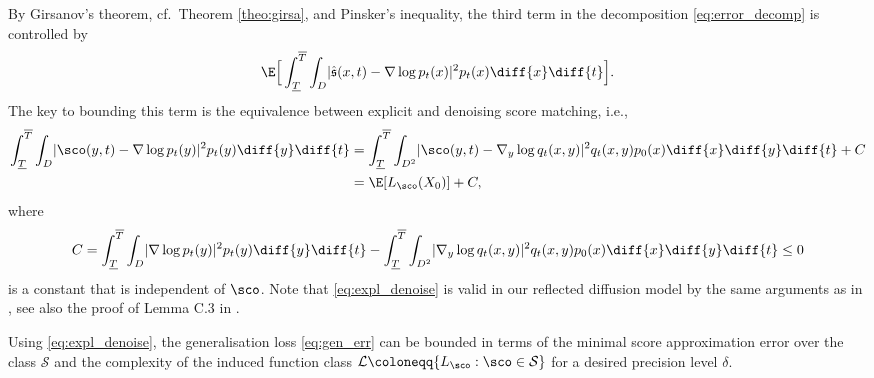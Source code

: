 \documentclass[a4paper, 11pt, headings = small, abstract]{scrartcl}
\begin{document}
By Girsanov's theorem, cf.\ Theorem \ref{theo:girsa}, and Pinsker's inequality, the third term in the decomposition \eqref{eq:error_decomp} is controlled by 
\begin{equation}\label{eq:gen_err}
\E\Big[\int_{\underline{T}}^{\overline{T}} \int_{D} \lvert \hat{\mathfrak{s}}(x,t) - \nabla \log p_t(x) \rvert^2 p_t(x) \diff{x} \diff{t}  \Big].
\end{equation} 
The key to bounding this term is the equivalence between explicit and denoising score matching, i.e.,
\begin{equation}\label{eq:expl_denoise}
\begin{split}
\int_{\underline{T}}^{\overline{T}}\int_D \lvert \sco(y,t) - \nabla \log p_t(y) \rvert^2 p_t(y) \diff{y} \diff{t} &= \int_{\underline{T}}^{\overline{T}}\int_{D^2} \lvert \sco(y,t) - \nabla_y \log q_t(x,y) \rvert^2 q_t(x,y) p_0(x) \diff{x} \diff{y} \diff{t} + C\\ 
&=\E[L_{\sco}(X_0)] + C, 
\end{split}
\end{equation}
where 
\[C = \int_{\underline{T}}^{\overline{T}}\int_D \lvert \nabla \log p_t(y) \rvert^2 p_t(y) \diff{y} \diff{t} - \int_{\underline{T}}^{\overline{T}}\int_{D^2} \lvert \nabla_y \log q_t(x,y) \rvert^2 q_t(x,y) p_0(x) \diff{x} \diff{y} \diff{t} \leq 0\] 
is a constant that is independent of $\sco$. Note that \eqref{eq:expl_denoise} is valid in our reflected diffusion model by the same arguments as in \cite{vincent11}, see also the proof of Lemma C.3 in \cite{oko23}.

Using \eqref{eq:expl_denoise}, the generalisation loss \eqref{eq:gen_err} can be bounded in terms of the minimal score approximation error over the class $\mathcal{S}$ and the complexity of the induced function class $\mathcal{L} \coloneqq \{L_{\sco} : \sco \in \mathcal{S}\}$ for a desired precision level $\delta$.
\end{document}
